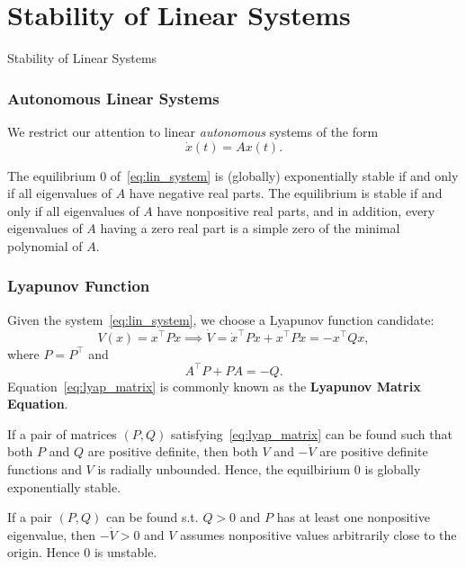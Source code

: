 \section{Stability of Linear Systems}

\begin{frame}
    Stability of Linear Systems


\end{frame}

\begingroup
\small



\begin{frame}
    \frametitle{Autonomous Linear Systems}

    We restrict our attention to linear \textit{autonomous} systems of the form 
    \begin{equation}
        \dot{x}(t) = A x(t).
        \label{eq:lin_system}
    \end{equation}

    \begin{theorem}
        The equilibrium $0$ of~\eqref{eq:lin_system} is (globally) exponentially
        stable if and only if all eigenvalues of $A$ have negative real parts.
        The equilibrium is stable if and only if all eigenvalues of $A$ have
        nonpositive real parts, and in addition, every eigenvalues of $A$ having
        a zero real part is a simple zero of the minimal polynomial of $A$.
    \end{theorem}
\end{frame}

\begin{frame}
    \frametitle{Lyapunov Function}

    Given the system~\eqref{eq:lin_system}, we choose a Lyapunov function
    candidate: \[ V(x) = x^\top P x \implies \dot{V} = \dot{x}^\top P x + x^\top
    P \dot{x} = - x^\top Q x, \] where $P = P^\top$ and 
    \begin{equation}
        A^\top P + PA = -Q.
        \label{eq:lyap_matrix}
    \end{equation}
    Equation~\eqref{eq:lyap_matrix} is commonly known as the \textbf{Lyapunov
    Matrix Equation}.
    \begin{rem}[Stability]
        If a pair of matrices $(P, Q)$ satisfying~\eqref{eq:lyap_matrix} can be
        found such that both $P$ and $Q$ are positive definite, then both $V$
        and $-\dot{V}$ are positive definite functions and $V$ is radially
        unbounded. Hence, the equilbirium $0$ is globally exponentially stable.

        If a pair $(P, Q)$ can be found s.t. $Q > 0$ and $P$ has at least one
        nonpositive eigenvalue, then $-\dot{V} > 0$ and $V$ assumes nonpositive
        values arbitrarily close to the origin. Hence $0$ is unstable.
    \end{rem}
\end{frame}


